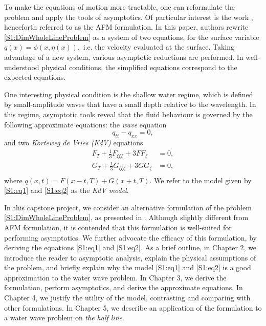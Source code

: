 To make the equations of motion more tractable, one can reformulate the problem and apply the tools of asymptotics. Of particular interest is the work \cite{AFM2006}, henceforth referred to as the AFM formulation. In this paper, authors rewrite \eqref{S1:DimWholeLineProblem} as a system of two equations, for the surface variable $q(x) = \phi(x, \eta(x)),$ i.e. the velocity evaluated at the surface. Taking advantage of a new system, various asymptotic reductions are performed. In well-understood physical conditions, the simplified equations correspond to the expected equations.

One interesting physical condition is the shallow water regime, which is defined by small-amplitude waves that have a small depth relative to the wavelength. In this regime, asymptotic tools reveal that the fluid behaviour is governed by the following approximate equations: the \textit{wave} equation
\begin{equation}\label{S1:eq1}
q_{tt} - q_{xx} = 0,
\end{equation} 
and two \textit{Korteweg de Vries (KdV)} equations
\begin{equation}\label{S1:eq2}
\begin{aligned}
F_{T} + \frac{1}{3}F_{\xi \xi \xi} + 3 F F_{\xi} &= 0, \\
G_{T} + \frac{1}{3}G_{\zeta \zeta \zeta} + 3 G G_{\zeta} &= 0, \\
\end{aligned}
\end{equation}
where $q(x,t) = F(x-t, T) + G(x+t, T).$ We refer to the model given by \eqref{S1:eq1} and \eqref{S1:eq2} as the \textit{KdV model}.

In this capstone project, we consider an alternative formulation of the problem \eqref{S1:DimWholeLineProblem}, as presented in \cite{OV2013}. Although slightly different from AFM formulation, it is contended  that this formulation is well-suited for performing asymptotics. We further advocate the efficacy of this formulation, by deriving the equations \eqref{S1:eq1} and \eqref{S1:eq2}. As a brief outline, in Chapter 2, we introduce the reader to asymptotic analysis, explain the physical assumptions of the problem, and briefly explain why the model \eqref{S1:eq1} and \eqref{S1:eq2} is a good approximation to the water wave problem. In Chapter 3, we derive the formulation, perform asymptotics, and derive the approximate equations. In Chapter 4, we justify the utility of the model, contrasting and comparing with other formulations. In Chapter 5, we describe an application of the formulation to a water wave problem on \textit{the half line}.
